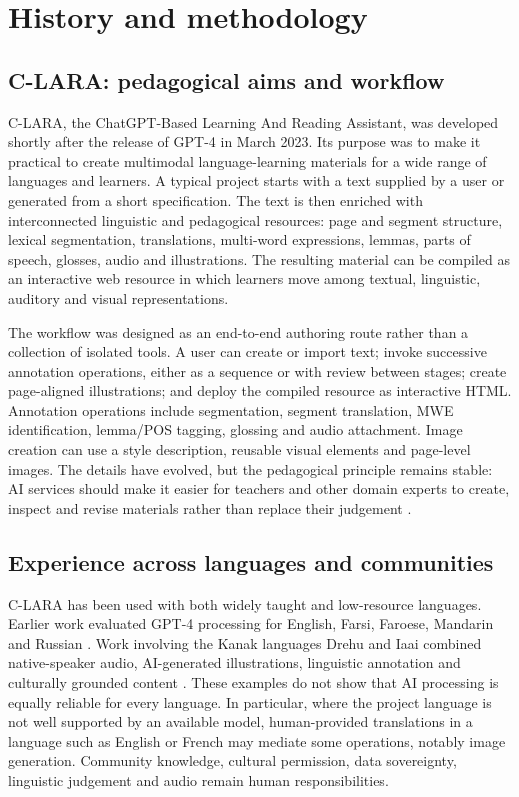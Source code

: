 \section{History and methodology}

\subsection{C-LARA: pedagogical aims and workflow}

C-LARA, the ChatGPT-Based Learning And Reading Assistant, was developed
shortly after the release of GPT-4 in March 2023. Its purpose was to make it
practical to create multimodal language-learning materials for a wide range
of languages and learners. A typical project starts with a text supplied by a
user or generated from a short specification. The text is then enriched with
interconnected linguistic and pedagogical resources: page and segment
structure, lexical segmentation, translations, multi-word expressions,
lemmas, parts of speech, glosses, audio and illustrations. The resulting
material can be compiled as an interactive web resource in which learners
move among textual, linguistic, auditory and visual representations.

The workflow was designed as an end-to-end authoring route rather than a
collection of isolated tools. A user can create or import text; invoke
successive annotation operations, either as a sequence or with review between
stages; create page-aligned illustrations; and deploy the compiled resource
as interactive HTML. Annotation operations include segmentation, segment
translation, MWE identification, lemma/POS tagging, glossing and audio
attachment. Image creation can use a style description, reusable visual
elements and page-level images. The details have evolved, but the pedagogical
principle remains stable: AI services should make it easier for teachers and
other domain experts to create, inspect and revise materials rather than
replace their judgement \citep{ChatGPTetal2023,RendinaEtAl2025}.

\subsection{Experience across languages and communities}

C-LARA has been used with both widely taught and low-resource languages.
Earlier work evaluated GPT-4 processing for English, Farsi, Faroese, Mandarin
and Russian \citep{ChatGPTetal2023}. Work involving the Kanak languages
Drehu and Iaai combined native-speaker audio, AI-generated illustrations,
linguistic annotation and culturally grounded content
\citep{BaeEtAl2025,ChieraEtAl2025,WelbyEtAl2024}. These examples do not show
that AI processing is equally reliable for every language. In particular,
where the project language is not well supported by an available model,
human-provided translations in a language such as English or French may
mediate some operations, notably image generation. Community knowledge,
cultural permission, data sovereignty, linguistic judgement and audio remain
human responsibilities.


